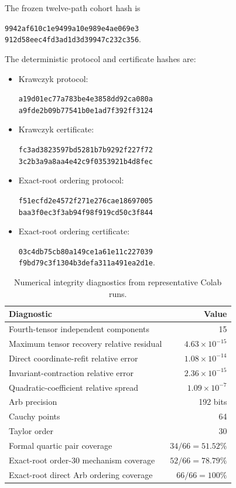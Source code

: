 \documentclass[11pt]{article}
\begin{document}
The frozen twelve-path cohort hash is
\begin{center}
\texttt{9942af610c1e9499a10e989e4ae069e3}\\
\texttt{912d58eec4fd3ad1d3d39947c232c356}.
\end{center}
The deterministic protocol and certificate hashes are:
\begin{itemize}[leftmargin=2em]

\item Krawczyk protocol:
\begin{center}
\texttt{a19d01ec77a783be4e3858dd92ca080a}\\
\texttt{a9fde2b09b77541b0e1ad7f392ff3124}
\end{center}

\item Krawczyk certificate:
\begin{center}
\texttt{fc3ad3823597bd5281b7b9292f227f72}\\
\texttt{3c2b3a9a8aa4e42c9f0353921b4d8fec}
\end{center}

\item Exact-root ordering protocol:
\begin{center}
\texttt{f51ecfd2e4572f271e276cae18697005}\\
\texttt{baa3f0ec3f3ab94f98f919cd50c3f844}
\end{center}

\item Exact-root ordering certificate:
\begin{center}
\texttt{03c4db75cb80a149ce1a61e11c227039}\\
\texttt{f9bd79c3f1304b3defa311a491ea2d1e}.
\end{center}

\end{itemize}

\begin{table}[h]
\centering
\caption{Numerical integrity diagnostics from representative Colab runs.}
\label{tab:integrity}
\small
\begin{tabular}{lr}
\toprule
Diagnostic & Value\\
\midrule
Fourth-tensor independent components & 15\\
Maximum tensor recovery relative residual & $4.63\times10^{-15}$\\
Direct coordinate-refit relative error & $1.08\times10^{-14}$\\
Invariant-contraction relative error & $2.36\times10^{-15}$\\
Quadratic-coefficient relative spread & $1.09\times10^{-7}$\\
Arb precision & 192 bits\\
Cauchy points & 64\\
Taylor order & 30\\
Formal quartic pair coverage & $34/66=51.52\%$\\
Exact-root order-30 mechanism coverage & $52/66=78.79\%$\\
Exact-root direct Arb ordering coverage & $66/66=100\%$\\
\bottomrule
\end{tabular}
\end{table}
\end{document}
